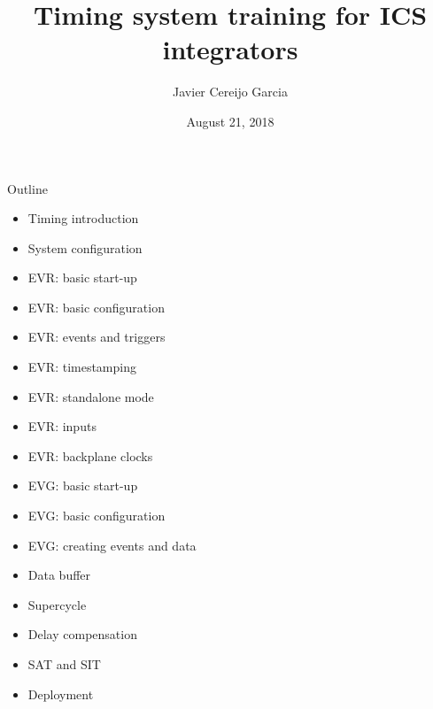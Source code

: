 \documentclass[
  9pt
  , table
  , ignorenonframetext
]{beamer}
\title{Timing system training for ICS integrators}
\author{Javier Cereijo Garcia}%
\institute{
  Integrated Control System Division\\
  \textbf{ESS}, Sweden
}
\date{August 21, 2018}
\begin{document}
\begin{frame}[plain]
  \titlepage
\end{frame}


\begin{frame}{Outline}
    \begin{itemize}
    \item Timing introduction
    \item System configuration
    \item EVR: basic start-up
    \item EVR: basic configuration
    \item EVR: events and triggers
    \item EVR: timestamping
    \item EVR: standalone mode
    \item EVR: inputs
    \item EVR: backplane clocks
    \item EVG: basic start-up
    \item EVG: basic configuration
    \item EVG: creating events and data
    \item Data buffer
    \item Supercycle
    \item Delay compensation
    \item SAT and SIT
    \item Deployment
    \end{itemize}
\end{frame}
\end{document}
